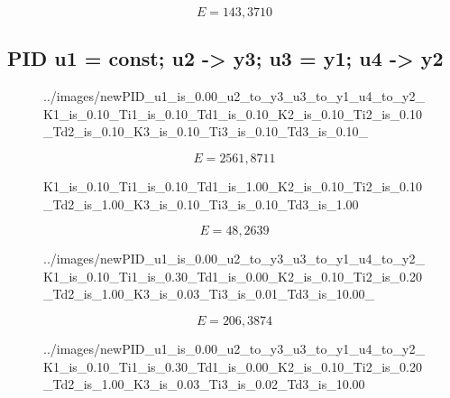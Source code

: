 \begin{equation}
    E = 143,3710
\end{equation}

\subsection{PID u1 = const; u2 -> y3; u3 = y1; u4 -> y2}

\begin{figure}[H]
    \centering
    
    \caption{../images/newPID_u1_is_0.00_u2_to_y3_u3_to_y1_u4_to_y2_K1_is_0.10_Ti1_is_0.10_Td1_is_0.10_K2_is_0.10_Ti2_is_0.10_Td2_is_0.10_K3_is_0.10_Ti3_is_0.10_Td3_is_0.10_}
\end{figure}

\begin{equation}
    E = 2561,8711
\end{equation}


\begin{figure}[H]
    \centering
    
    \caption{K1_is_0.10_Ti1_is_0.10_Td1_is_1.00_K2_is_0.10_Ti2_is_0.10_Td2_is_1.00_K3_is_0.10_Ti3_is_0.10_Td3_is_1.00}
\end{figure}

\begin{equation}
    E = 48,2639
\end{equation}


\begin{figure}[H]
    \centering
    
    \caption{../images/newPID_u1_is_0.00_u2_to_y3_u3_to_y1_u4_to_y2_K1_is_0.10_Ti1_is_0.30_Td1_is_0.00_K2_is_0.10_Ti2_is_0.20_Td2_is_1.00_K3_is_0.03_Ti3_is_0.01_Td3_is_10.00_}
\end{figure}

\begin{equation}
    E = 206,3874
\end{equation}


\begin{figure}[H]
    \centering
    
    \caption{../images/newPID_u1_is_0.00_u2_to_y3_u3_to_y1_u4_to_y2_K1_is_0.10_Ti1_is_0.30_Td1_is_0.00_K2_is_0.10_Ti2_is_0.20_Td2_is_1.00_K3_is_0.03_Ti3_is_0.02_Td3_is_10.00}
\end{figure}


